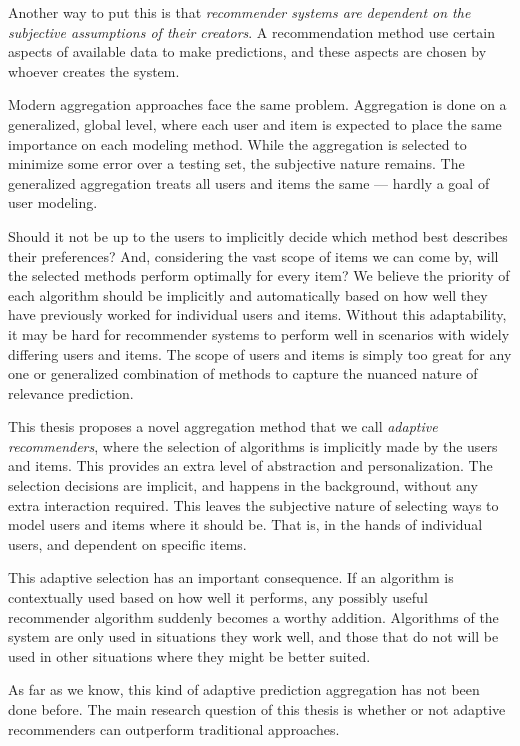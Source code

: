 Another way to put this is that 
\emph{recommender systems are dependent on the subjective assumptions of their creators}.
A recommendation method use certain aspects of available data to make predictions,
and these aspects are chosen by whoever creates the system.

Modern aggregation approaches face the same problem. 
Aggregation is done on a generalized, global level,
where each user and item is expected to place the same importance on each modeling method.
While the aggregation is selected to minimize some error over a testing set,
the subjective nature remains. The generalized aggregation treats all users and items the same 
--- hardly a goal of user modeling.

Should it not be up to the users to implicitly decide which method best describes their preferences?
And, considering the vast scope of items we can come by, will the selected
methods perform optimally for every item?
We believe the priority of each algorithm should be implicitly and automatically
based on how well they have previously worked for individual users and items.
Without this adaptability, it may be hard for recommender systems
to perform well in scenarios with widely differing users and items.
The scope of users and items is simply too great for any one or generalized combination
of methods to capture the nuanced nature of relevance prediction.

This thesis proposes a novel aggregation method that we call \emph{adaptive recommenders}, 
where the selection of algorithms is implicitly made by the users and items.
This provides an extra level of abstraction and personalization.
The selection decisions are implicit, and happens in the background, without any extra interaction required.
This leaves the subjective nature of selecting ways to model users and items where it should be.
That is, in the hands of individual users, and dependent on specific items.

This adaptive selection has an important consequence. 
If an algorithm is contextually used based on how well it performs,
any possibly useful recommender algorithm suddenly becomes a worthy addition.
Algorithms of the system are only used in situations they work well,
and those that do not will be used in other situations where they might be better suited.

As far as we know, this kind of adaptive prediction aggregation has not been done before.
The main research question of this thesis is whether or not adaptive recommenders
can outperform traditional approaches.

